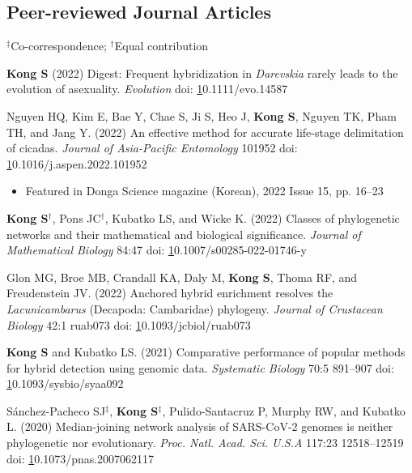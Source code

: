 \documentclass[11pt]{article}
\begin{document}
\pagebreak

\subsection*{Peer-reviewed Journal Articles}
$^\ddag$Co-correspondence; $^\dag$Equal contribution
\begin{etaremune}

\item \textbf{Kong S} (2022) Digest: Frequent hybridization in \textit{Darevskia} rarely leads to the evolution of asexuality. \textit{Evolution} doi: \href{https://doi.org/10.1111/evo.14587}10.1111/evo.14587

\item Nguyen HQ, Kim E, Bae Y, Chae S, Ji S, Heo J, \textbf{Kong S}, Nguyen TK, Pham TH, and Jang Y. (2022) An effective method for accurate life-stage delimitation of cicadas. \textit{Journal of Asia-Pacific Entomology} 101952 doi: \href{https://doi.org/10.1016/j.aspen.2022.101952}10.1016/j.aspen.2022.101952
	\begin{itemize}\item Featured in Donga Science magazine (Korean), 2022 Issue 15, pp. 16--23 \end{itemize}

\item \textbf{Kong S}$^\dag$, Pons JC$^\dag$, Kubatko LS, and Wicke K. (2022) Classes of phylogenetic networks and their mathematical and biological significance. \textit{Journal of Mathematical Biology} 84:47 doi: \href{https://doi.org/10.1007/s00285-022-01746-y}10.1007/s00285-022-01746-y

\item Glon MG, Broe MB, Crandall KA, Daly M, \textbf{Kong S}, Thoma RF, and Freudenstein JV. (2022) Anchored hybrid enrichment resolves the \textit{Lacunicambarus} (Decapoda: Cambaridae) phylogeny. \textit{Journal of Crustacean Biology} 42:1 ruab073 doi: \href{https://doi.org/10.1093/jcbiol/ruab073}10.1093/jcbiol/ruab073

\item \textbf{Kong S} and Kubatko LS. (2021) Comparative performance of popular methods for hybrid detection using genomic data. \textit {Systematic Biology} 70:5 891–907 doi: \href{https://doi.org/10.1093/sysbio/syaa092}10.1093/sysbio/syaa092

\item  Sánchez-Pacheco SJ{$^\ddag$}, \textbf{Kong S}{$^\ddag$}, Pulido-Santacruz P, Murphy RW, and Kubatko L. (2020) Median-joining network analysis of SARS-CoV-2 genomes is neither phylogenetic nor evolutionary. \textit{Proc. Natl. Acad. Sci. U.S.A} 117:23 12518–12519 doi: \href{https://doi.org/10.1073/pnas.2007062117}10.1073/pnas.2007062117
	

\end{etaremune}
\end{document}
